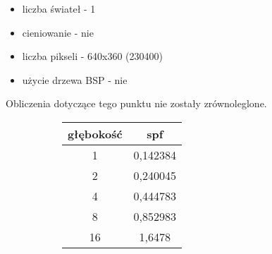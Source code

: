\begin{itemize}

\item liczba świateł - 1
\item cieniowanie - nie
\item liczba pikseli - 640x360 (230400)
\item użycie drzewa BSP - nie

\end{itemize}

Obliczenia dotyczące tego punktu nie zostały zrównoleglone.

\begin{figure}[!htb]
\advance\leftskip-2cm
\begin{subfigure}{.5\textwidth}
\end{subfigure}
\hspace{2cm}
\begin{subfigure}{.5\textwidth}
		\begin{longtable}{|c|c|} \hline
	    głębokość & spf \\ \hline
	    1 & 0,142384 \\
		2 & 0,240045 \\
		4 & 0,444783 \\
		8 & 0,852983 \\
		16 & 1,6478 \\
		\hline
		\end{longtable}
\end{subfigure}
\end{figure}


